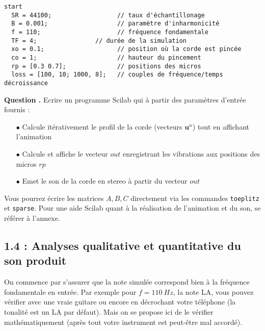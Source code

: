 \documentclass[a4,12pt]{article}
\newcommand{\ub}{\mathbf{u}}
\newcounter{Nbquestion}
\newcommand*\question{%
\stepcounter{Nbquestion}%
\textbf{Question \theNbquestion. }}
\begin{document}
  \begin{lstlisting}[frame=single,caption=Paramètres d'entrée]  
  start
  SR = 44100;                  // taux d'échantillonage 
  B = 0.001;                   // paramètre d'inharmonicité
  f = 110;                     // fréquence fondamentale
  TF = 4;			     // durée de la simulation
  xo = 0.1;                    // position où la corde est pincée
  co = 1;                      // hauteur du pincement
  rp = [0.3 0.7];              // positions des micros
  loss = [100, 10; 1000, 8];   // couples de fréquence/temps décroissance
  \end{lstlisting}


  \question Ecrire un programme Scilab qui à partir des paramètres d'entrée fournis : \\

  \begin{itemize}
    \item[$\bullet$] Calcule itérativement le profil de la corde (vecteurs $\ub^n$) tout en affichant l'animation\\
    \item[$\bullet$] Calcule et affiche le vecteur $out$ enregistrant les vibrations aux positions des micros $rp$\\ 	\item[$\bullet$] Emet le son de la corde en stereo à partir du vecteur $out$
  \end{itemize}


  Vous pourrez écrire les matrices $A,B,C$ directement via les commandes \verb"toeplitz" et \verb"sparse".
  Pour une aide Scilab quant à la réalisation de l'animation et du son, se référer à l'annexe.

  \subsection*{1.4 : Analyses qualitative et quantitative du son produit}

  On commence par s'assurer que la note simulée correspond bien à la fréquence fondamentale en entrée. Par exemple pour $f=110~Hz$, la note LA, vous pouvez vérifier avec une vraie guitare ou encore en décrochant votre téléphone (la tonalité est un LA par défaut). Mais on se propose ici de le vérifier mathématiquement (après tout votre instrument est peut-être mal accordé). 

\end{document}
